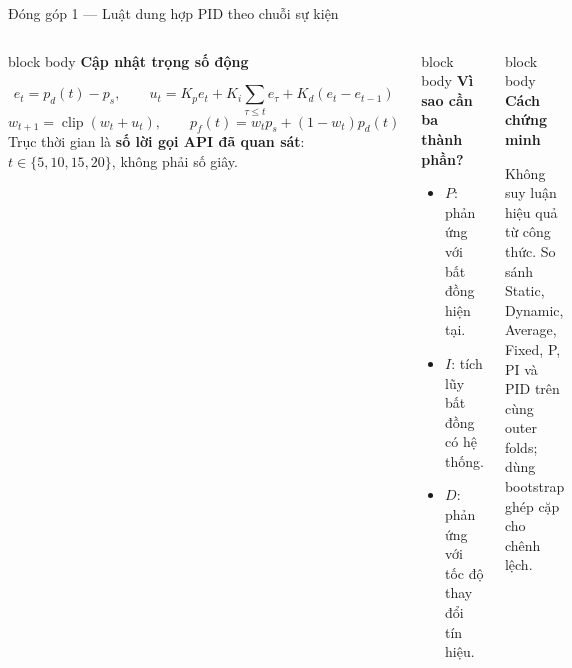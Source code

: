 \documentclass[aspectratio=169,10pt]{beamer}
\newcommand{\smallbullet}{\setlength{\itemsep}{0.15em}\setlength{\parskip}{0pt}}
\newenvironment{bluebox}[1]{%
  \begin{beamercolorbox}[rounded=true,shadow=true,sep=0.18cm]{block body}%
  {\color{uetblue}\textbf{#1}}\par\vspace{0.08cm}\color{ink}%
}{\end{beamercolorbox}}
\begin{document}
\begin{frame}[t,shrink=7]{Đóng góp 1 — Luật dung hợp PID theo chuỗi sự kiện}
\begin{columns}[T,onlytextwidth]
\begin{bluebox}{Cập nhật trọng số động}
\[
e_t=p_d(t)-p_s,\qquad
u_t=K_p e_t+K_i\sum_{\tau\le t}e_\tau+K_d(e_t-e_{t-1})
\]
\[
w_{t+1}=\operatorname{clip}(w_t+u_t),\qquad
p_f(t)=w_t p_s+(1-w_t)p_d(t)
\]
\small
Trục thời gian là \textbf{số lời gọi API đã quan sát}: $t\in\{5,10,15,20\}$, không phải số giây.
\end{bluebox}

\small
\begin{bluebox}{Vì sao cần ba thành phần?}
\begin{itemize}\smallbullet
  \item $P$: phản ứng với bất đồng hiện tại.
  \item $I$: tích lũy bất đồng có hệ thống.
  \item $D$: phản ứng với tốc độ thay đổi tín hiệu.
\end{itemize}
\end{bluebox}

\vspace{0.15cm}
\begin{bluebox}{Cách chứng minh}
Không suy luận hiệu quả từ công thức. So sánh Static, Dynamic, Average, Fixed, P, PI và PID trên cùng outer folds; dùng bootstrap ghép cặp cho chênh lệch.
\end{bluebox}
\end{columns}
\end{frame}
\end{document}
